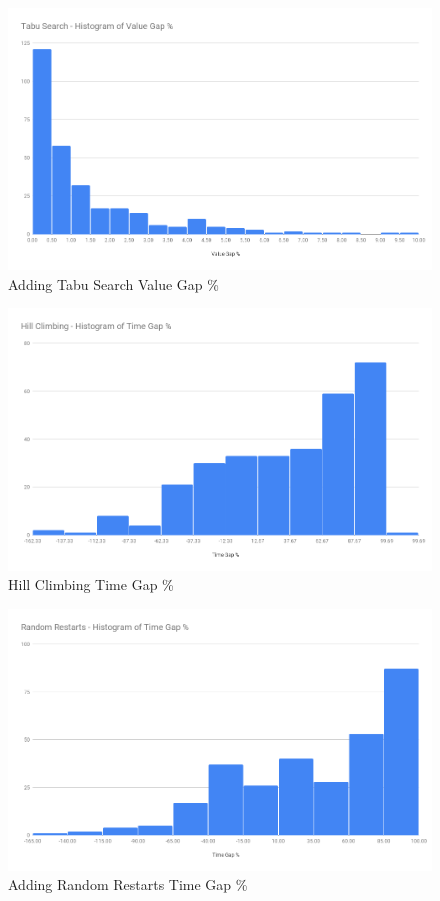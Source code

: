\begin{figure}[!htbp]
    \centering
    \includegraphics[width=\textwidth]{Figures/Metaheuristics/tabu_value_gap.png}
    \caption{Adding Tabu Search Value Gap \%}
    \label{fig:value_gap_perc_tabu}
\end{figure}

\begin{figure}[!htbp]
    \centering
    \includegraphics[width=\textwidth]{Figures/Metaheuristics/hill_climb_time_gap.png}
    \caption{Hill Climbing Time Gap \%}
    \label{fig:time_gap_perc_hill_climb}
\end{figure}

\begin{figure}[!htbp]
    \centering
    \includegraphics[width=\textwidth]{Figures/Metaheuristics/restarts_time_gap.png}
    \caption{Adding Random Restarts Time Gap \%}
    \label{fig:time_gap_perc_restarts}
\end{figure}

